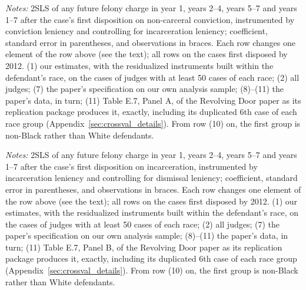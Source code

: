 \documentclass[11pt]{article}
\newcommand{\tabnote}[1]{\par\vspace{0.6ex}\begin{minipage}{\linewidth}\linespread{1}\footnotesize\textit{Notes:} #1\end{minipage}}
\begin{document}
\begin{table}[H]
\centering
\caption{From our estimates to Table E.7 of the Revolving Door paper: non-carceral conviction and future felony charges}\label{tab:cv_conv}
{\renewcommand{\arraystretch}{0.9}\resizebox{\textwidth}{!}{}}
\tabnote{2SLS of any future felony charge in year 1, years 2--4, years 5--7 and years 1--7 after the case's first disposition on non-carceral conviction, instrumented by conviction leniency and controlling for incarceration leniency; coefficient, standard error in parentheses, and observations in braces. Each row changes one element of the row above (see the text); all rows on the cases first disposed by 2012. (1) our estimates, with the residualized instruments built within the defendant's race, on the cases of judges with at least 50 cases of each race; (2) all judges; (7) the paper's specification on our own analysis sample; (8)--(11) the paper's data, in turn; (11) Table E.7, Panel A, of the Revolving Door paper as its replication package produces it, exactly, including its duplicated 6th case of each race group (Appendix~\ref{sec:crossval_details}). From row (10) on, the first group is non-Black rather than White defendants.}
\end{table}

\begin{table}[H]
\centering
\caption{From our estimates to Table E.7 of the Revolving Door paper: incarceration and future felony charges}\label{tab:cv_incar}
{\renewcommand{\arraystretch}{0.9}\resizebox{\textwidth}{!}{}}
\tabnote{2SLS of any future felony charge in year 1, years 2--4, years 5--7 and years 1--7 after the case's first disposition on incarceration, instrumented by incarceration leniency and controlling for dismissal leniency; coefficient, standard error in parentheses, and observations in braces. Each row changes one element of the row above (see the text); all rows on the cases first disposed by 2012. (1) our estimates, with the residualized instruments built within the defendant's race, on the cases of judges with at least 50 cases of each race; (2) all judges; (7) the paper's specification on our own analysis sample; (8)--(11) the paper's data, in turn; (11) Table E.7, Panel B, of the Revolving Door paper as its replication package produces it, exactly, including its duplicated 6th case of each race group (Appendix~\ref{sec:crossval_details}). From row (10) on, the first group is non-Black rather than White defendants.}
\end{table}
\end{document}
